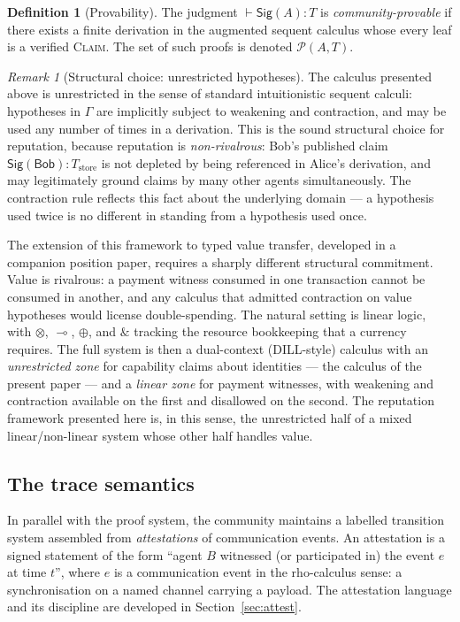 \documentclass[11pt]{article}
\theoremstyle{definition}
\newtheorem{definition}{Definition}[section]
\theoremstyle{plain}
\theoremstyle{remark}
\newtheorem*{remark}{Remark}
\newcommand{\Sig}{\mathsf{Sig}}
\newcommand{\Bob}{\mathsf{Bob}}
\newcommand{\Proofs}{\mathcal{P}}
\begin{document}
\begin{definition}[Provability]
The judgment $\vdash \Sig(A) : T$ is \emph{community-provable} if there exists a finite derivation in the augmented sequent calculus whose every leaf is a verified \textsc{Claim}. The set of such proofs is denoted $\Proofs(A,T)$.
\end{definition}

\begin{remark}[Structural choice: unrestricted hypotheses]\label{rem:unrestricted}
The calculus presented above is unrestricted in the sense of standard intuitionistic sequent calculi: hypotheses in $\Gamma$ are implicitly subject to weakening and contraction, and may be used any number of times in a derivation. This is the sound structural choice for reputation, because reputation is \emph{non-rivalrous}: Bob's published claim $\Sig(\Bob) : T_{\text{store}}$ is not depleted by being referenced in Alice's derivation, and may legitimately ground claims by many other agents simultaneously. The contraction rule reflects this fact about the underlying domain --- a hypothesis used twice is no different in standing from a hypothesis used once.

The extension of this framework to typed value transfer, developed in a companion position paper, requires a sharply different structural commitment. Value is rivalrous: a payment witness consumed in one transaction cannot be consumed in another, and any calculus that admitted contraction on value hypotheses would license double-spending. The natural setting is linear logic, with $\otimes$, $\multimap$, $\oplus$, and $\&$ tracking the resource bookkeeping that a currency requires. The full system is then a dual-context (DILL-style) calculus with an \emph{unrestricted zone} for capability claims about identities --- the calculus of the present paper --- and a \emph{linear zone} for payment witnesses, with weakening and contraction available on the first and disallowed on the second. The reputation framework presented here is, in this sense, the unrestricted half of a mixed linear/non-linear system whose other half handles value.
\end{remark}

\subsection{The trace semantics}\label{ssec:traces}

In parallel with the proof system, the community maintains a labelled transition system assembled from \emph{attestations} of communication events. An attestation is a signed statement of the form ``agent $B$ witnessed (or participated in) the event $e$ at time $t$'', where $e$ is a communication event in the rho-calculus sense: a synchronisation on a named channel carrying a payload. The attestation language and its discipline are developed in Section~\ref{sec:attest}.
\end{document}
